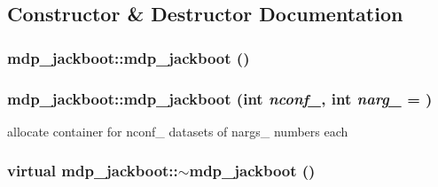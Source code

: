 \subsection{Constructor \& Destructor Documentation}
\hypertarget{classmdp__jackboot_a7cb2ed899f90ecc23bd0a4eecf15e8d9}{
\subsubsection[{mdp\_\-jackboot}]{\setlength{\rightskip}{0pt plus 5cm}mdp\_\-jackboot::mdp\_\-jackboot ()}}
\label{classmdp__jackboot_a7cb2ed899f90ecc23bd0a4eecf15e8d9}
\hypertarget{classmdp__jackboot_a528121e64281ffc30843b720f7c6354a}{
\subsubsection[{mdp\_\-jackboot}]{\setlength{\rightskip}{0pt plus 5cm}mdp\_\-jackboot::mdp\_\-jackboot (int {\em nconf\_\-}, \/  int {\em narg\_\-} = {})}}
\label{classmdp__jackboot_a528121e64281ffc30843b720f7c6354a}


allocate container for nconf\_\- datasets of nargs\_\- numbers each \hypertarget{classmdp__jackboot_aff3993d59a2c97e449e79da8dfdbbe86}{
\subsubsection[{$\sim$mdp\_\-jackboot}]{\setlength{\rightskip}{0pt plus 5cm}virtual mdp\_\-jackboot::$\sim$mdp\_\-jackboot ()}}
\label{classmdp__jackboot_aff3993d59a2c97e449e79da8dfdbbe86}



